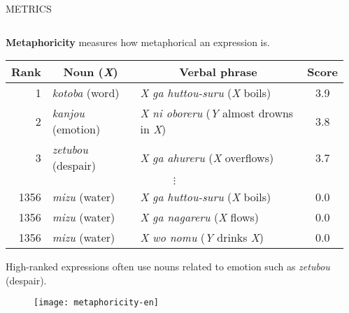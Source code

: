 \documentclass[unicode,20pt]{beamer}
\newcommand\header[1]{\multicolumn{1}{c}{\textbf{#1}}}
\newcommand\msubsection[1]{\textcolor{sPink}{\textbf{\large \exo{#1}}}}
\begin{document}
\begin{frame}
\begin{columns}[t]
\begin{column}{.968\textwidth}
\begin{alertblock}{METRICS}
\begin{columns}[t]
\begin{column}{.3\textwidth}
                        \textbf{Metaphoricity} measures how metaphorical an expression is.

                        \begin{table}
                            \centering\scriptsize
                            \begin{tabular}{rllc}
                                \toprule%
                                \header{Rank} & \header{Noun (\emph{X})} & \header{Verbal phrase} & \header{Score} \\
                                \midrule%
                                1 & \emph{kotoba} (word)     & \emph{X ga huttou-suru} (\emph{X} boils)          & 3.9 \\
                                2 & \emph{kanjou} (emotion)  & \emph{X ni oboreru} (\emph{Y} almost drowns in \emph{X}) & 3.8 \\
                                3 & \emph{zetubou} (despair) & \emph{X ga ahureru} (\emph{X} overflows)          & 3.7 \\
                                \multicolumn{4}{c}{$\vdots$} \\
                                1356 & \emph{mizu} (water) & \emph{X ga huttou-suru} (\emph{X} boils)      & 0.0 \\
                                1356 & \emph{mizu} (water) & \emph{X ga nagareru} (\emph{X} flows)         & 0.0 \\
                                1356 & \emph{mizu} (water) & \emph{X wo nomu} (\emph{Y} drinks \emph{X})          & 0.0 \\
                                \bottomrule%
                            \end{tabular}
                        \end{table}

                        High-ranked expressions often use nouns related to emotion
                        such as \emph{zetubou} (despair).

                        \begin{figure}
                            \centering
                            \texttt{[image: metaphoricity-en]}
                        \end{figure}

                    \end{column}

                    \begin{column}{.3\textwidth}
                        \msubsection{Novelty}


\end{column}
\end{columns}
\end{alertblock}
\end{column}
\end{columns}
\end{frame}
\end{document}
